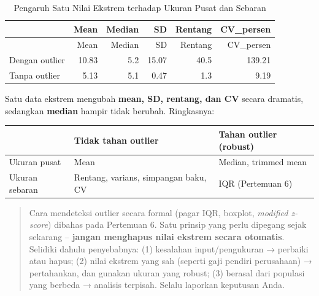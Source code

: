 \documentclass[
  indonesian,
  letterpaper,
]{book}
\newcounter{none} %
\begin{document}
\begin{longtable}[]{@{}lrrrrr@{}}
\caption{Pengaruh Satu Nilai Ekstrem terhadap Ukuran Pusat dan
Sebaran}\tabularnewline
\toprule\noalign{}
& Mean & Median & SD & Rentang & CV\_persen \\
\midrule\noalign{}
\endfirsthead
\toprule\noalign{}
& Mean & Median & SD & Rentang & CV\_persen \\
\midrule\noalign{}
\endhead
\bottomrule\noalign{}
\endlastfoot
Dengan outlier & 10.83 & 5.2 & 15.07 & 40.5 & 139.21 \\
Tanpa outlier & 5.13 & 5.1 & 0.47 & 1.3 & 9.19 \\
\end{longtable}

Satu data ekstrem mengubah \textbf{mean, SD, rentang, dan CV} secara
dramatis, sedangkan \textbf{median} hampir tidak berubah. Ringkasnya:

{\def\LTcaptype{none} %
\begin{longtable}[]{@{}
  >{\raggedright\arraybackslash}p{}
  >{\raggedright\arraybackslash}p{}
  >{\raggedright\arraybackslash}p{}@{}}
\toprule\noalign{}
\begin{minipage}[b]{\linewidth}\raggedright
\end{minipage} & \begin{minipage}[b]{\linewidth}\raggedright
Tidak tahan outlier
\end{minipage} & \begin{minipage}[b]{\linewidth}\raggedright
Tahan outlier (robust)
\end{minipage} \\
\midrule\noalign{}
\endhead
\bottomrule\noalign{}
\endlastfoot
Ukuran pusat & Mean & Median, trimmed mean \\
Ukuran sebaran & Rentang, varians, simpangan baku, CV & IQR (Pertemuan
6) \\
\end{longtable}
}

\begin{quote}
Cara mendeteksi outlier secara formal (pagar IQR, boxplot,
\emph{modified z-score}) dibahas pada Pertemuan 6. Satu prinsip yang
perlu dipegang sejak sekarang -- \textbf{jangan menghapus nilai ekstrem
secara otomatis}. Selidiki dahulu penyebabnya: (1) kesalahan
input/pengukuran → perbaiki atau hapus; (2) nilai ekstrem yang sah
(seperti gaji pendiri perusahaan) → pertahankan, dan gunakan ukuran yang
robust; (3) berasal dari populasi yang berbeda → analisis terpisah.
Selalu laporkan keputusan Anda.
\end{quote}
\end{document}

